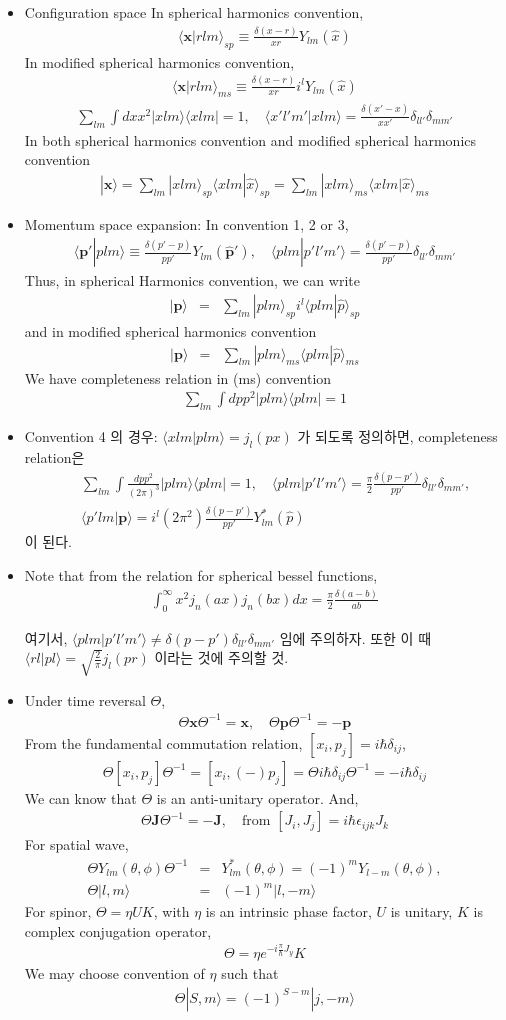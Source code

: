 \documentclass[10pt]{article}
\def\bm{\boldsymbol}
\newcommand{\bea}{\begin{eqnarray}}
\newcommand{\eea}{\end{eqnarray}}
\newcommand{\no}{\nonumber \\}
\def\vp{{\bm p}}
\def\vx{{\bm x}}
\def\la{\langle}
\def\ra{\rangle}
\begin{document}
\begin{itemize}
\item Configuration space
In spherical harmonics convention,
\bea
\la \vx| r l m\ra_{sp}\equiv 
\frac{\delta(x-r)}{xr} Y_{lm}(\hat{x})
\eea
In modified spherical harmonics convention,
\bea
\la \vx| r l m\ra_{ms}\equiv 
\frac{\delta(x-r)}{xr} i^l Y_{lm}(\hat{x})
\eea
\bea
\sum_{lm}\int dx x^2 | xlm\ra \la x lm|=1 ,\quad 
\la x' l' m'| x lm\ra=\frac{\delta(x'-x)}{xx'}\delta_{ll'}\delta_{mm'}
\eea
In both spherical harmonics convention and 
modified spherical harmonics convention
\bea
|\vx\ra=\sum_{lm} |x lm\ra_{sp} \la x lm|\hat{x}\ra_{sp}
=\sum_{lm} |x lm\ra_{ms} \la x lm|\hat{x}\ra_{ms}         
\eea

\item Momentum space expansion: In convention 1, 2 or 3,
\bea
\la \vp'|p l m\ra\equiv \frac{\delta(p'-p)}{p p'}Y_{lm}(\hat{\vp}'),
\quad \la p lm |p'l'm'\ra=\frac{\delta(p'-p)}{p p'}\delta_{ll'}\delta_{mm'}
\eea
Thus, in spherical Harmonics convention, we 
can write
\bea
|\vp\ra&=&\sum_{lm} |p lm\ra_{sp} i^l \la plm|\hat{p}\ra_{sp}
\eea
and in modified spherical harmonics convention
\bea
|\vp\ra&=&\sum_{lm} |p lm\ra_{ms} \la plm|\hat{p}\ra_{ms}
\eea
We have completeness relation in (ms) convention 
\bea
\sum_{lm}\int dp p^2 |p lm\ra \la p lm|
=1
\eea

\item Convention 4 의 경우:
$\la x lm|p lm\ra=j_l(px) $ 가 되도록 정의하면, 
completeness relation은
\bea
& &\sum_{lm}\int \frac{dp p^2}{(2\pi)^3} |p lm\ra \la p lm| =1,\quad
  \la p lm|p' l' m'\ra= \frac{\pi}{2}
     \frac{\delta(p-p')}{pp'}\delta_{ll'}\delta_{mm'},\no
& &\la p' lm|\vp\ra= i^l (2\pi^2)\frac{\delta(p-p')}{ pp'}Y^*_{lm}(\hat{p})
\eea 
이 된다. 

\item  
Note that from the relation for spherical bessel functions,
\bea
\boxed{
\int_0^\infty x^2 j_n(a x) j_n(b x)dx
=\frac{\pi}{2}\frac{\delta(a-b)}{ab}}
\eea

여기서, $\la p lm|p' l' m'\ra\neq \delta(p-p')\delta_{ll'}\delta_{mm'}$ 임에 주의하자.
또한 이 때 $\la rl|p l\ra=\sqrt{\frac{2}{\pi}}j_l(pr)$ 이라는
것에 주의할 것.

\item Under time reversal $\Theta$,
\bea 
\Theta\vx\Theta^{-1}=\vx, \quad \Theta\vp\Theta^{-1}=-\vp 
\eea 
From the fundamental commutation relation, $[x_i,p_j]=i\hbar\delta_{ij}$, 
\bea 
\Theta [x_i,p_j]\Theta^{-1}=[x_i,(-)p_j]
=\Theta i\hbar \delta_{ij} \Theta^{-1}=-i\hbar\delta_{ij}
\eea 
We can know that $\Theta$ is an anti-unitary operator.
And,
\bea 
\Theta {\bm J}\Theta^{-1}=-{\bm J},
\quad \mbox{from } [J_i,J_j]=i\hbar\epsilon_{ijk}J_k
\eea 
For spatial wave,
\bea 
\Theta Y_{lm}(\theta,\phi)\Theta^{-1}
&=&Y_{lm}^*(\theta,\phi)
    =(-1)^m Y_{l-m}(\theta,\phi),\no  
\Theta|l,m\ra &=& (-1)^m|l,-m\ra     
\eea 
For spinor, $\Theta=\eta U K $, with $\eta$ is an intrinsic
phase factor, $U$ is unitary, $K$ is complex conjugation operator,
\bea 
\Theta= \eta e^{-i\frac{\pi}{\hbar} J_y} K
\eea  
We may choose convention of $\eta$ such that
\bea 
\Theta |S,m\ra =(-1)^{S-m}|j,-m\ra 
\eea 


\end{itemize}
\end{document}
